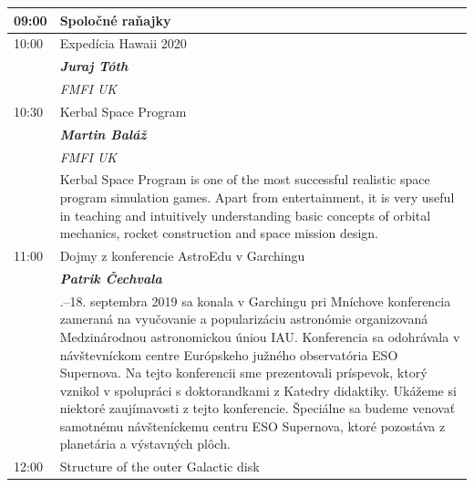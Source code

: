 \documentclass[a4paper]{report}
\begin{document}
        \begin{tabularx}{\textwidth}{>{}p{2cm} >{\RaggedRight}X}
            \toprule
                            {\Large 09:00} & {\Large Spoločné raňajky} \\
                                                                                \midrule                            {\Large 10:00} & {\Large Expedícia Hawaii 2020} \\
                                            & \textit{\textbf{Juraj Tóth}} \\
                                                                & \textit{FMFI UK} \\
                                                            \midrule                            {\Large 10:30} & {\Large Kerbal Space Program} \\
                                            & \textit{\textbf{Martin Baláž}} \\
                                                                & \textit{FMFI UK} \\
                                                                & Kerbal Space Program is one of the most successful realistic space program simulation games. Apart from entertainment, it is very useful in teaching and intuitively understanding basic concepts of orbital mechanics, rocket construction and space mission design.
 \\
                                        \midrule                            {\Large 11:00} & {\Large Dojmy z konferencie AstroEdu v Garchingu} \\
                                            & \textit{\textbf{Patrik Čechvala}} \\
                                                                                    & 16.--18. septembra 2019 sa konala v Garchingu pri Mníchove konferencia zameraná na vyučovanie a popularizáciu astronómie organizovaná Medzinárodnou astronomickou úniou IAU. Konferencia sa odohrávala v návštevníckom centre Európskeho južného observatória ESO Supernova. Na tejto konferencii sme prezentovali príspevok, ktorý vznikol v spolupráci s doktorandkami z Katedry didaktiky. Ukážeme si niektoré zaujímavosti z tejto konferencie. Špeciálne sa budeme venovať samotnému návšteníckemu centru ESO Supernova, ktoré pozostáva z planetária a výstavných plôch.
 \\
                                        \midrule                            {\Large 12:00} & {\Large Structure of the outer Galactic disk} \\

\end{tabularx}
\end{document}
